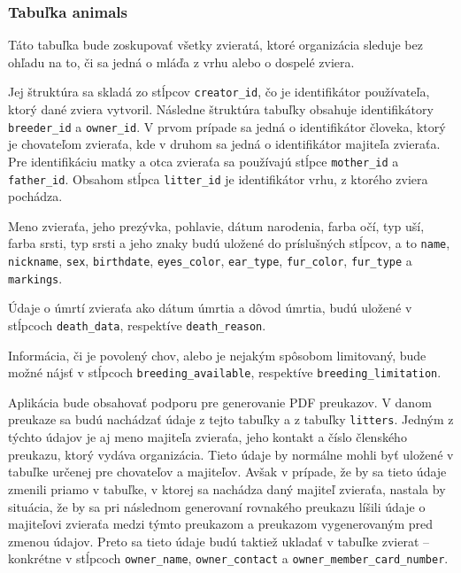 \subsubsection*{Tabuľka animals}\label{tabulka-animals}
Táto tabuľka bude zoskupovať všetky zvieratá, ktoré organizácia sleduje bez ohľadu na to, či sa jedná o mláďa z vrhu alebo o dospelé zviera. 

Jej štruktúra sa skladá zo stĺpcov \texttt{creator_id}, čo je identifikátor používateľa, ktorý dané zviera vytvoril. Následne štruktúra tabuľky obsahuje identifikátory \texttt{breeder_id} a \texttt{owner_id}. V prvom prípade sa jedná o identifikátor človeka, ktorý je chovateľom zvieraťa, kde v druhom sa jedná o identifikátor majiteľa zvieraťa. Pre identifikáciu matky a otca zvieraťa sa používajú stĺpce \texttt{mother_id} a \texttt{father_id}. Obsahom stĺpca \texttt{litter_id} je identifikátor vrhu, z ktorého zviera pochádza.

Meno zvieraťa, jeho prezývka, pohlavie, dátum narodenia, farba očí, typ uší, farba srsti, typ srsti a jeho znaky budú uložené do príslušných stĺpcov, a to  \texttt{name}, \texttt{nickname}, \texttt{sex}, \texttt{birthdate}, \texttt{eyes_color}, \texttt{ear_type}, \texttt{fur_color}, \texttt{fur_type} a \texttt{markings}.

Údaje o úmrtí zvieraťa ako dátum úmrtia a dôvod úmrtia, budú uložené v stĺpcoch \texttt{death_data}, respektíve \texttt{death_reason}.

Informácia, či je povolený chov, alebo je nejakým spôsobom limitovaný, bude možné nájsť v stĺpcoch \texttt{breeding_available}, respektíve \texttt{breeding_limitation}.

Aplikácia bude obsahovať podporu pre generovanie PDF preukazov. V danom preukaze sa budú nachádzať údaje z tejto tabuľky a z tabuľky \texttt{litters}. Jedným z týchto údajov je aj meno majiteľa zvieraťa, jeho kontakt a číslo členského preukazu, ktorý vydáva organizácia. Tieto údaje by normálne mohli byť uložené v tabuľke určenej pre chovateľov a majiteľov. Avšak v prípade, že by sa tieto údaje zmenili priamo v tabuľke, v ktorej sa nachádza daný majiteľ zvieraťa, nastala by situácia, že by sa pri následnom generovaní rovnakého preukazu líšili údaje o majiteľovi zvieraťa medzi týmto preukazom a preukazom vygenerovaným pred zmenou údajov.
Preto sa tieto údaje budú taktiež ukladať v tabuľke zvierat -- konkrétne v stĺpcoch \texttt{owner_name}, \texttt{owner_contact} a \texttt{owner_member_card_number}.

